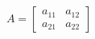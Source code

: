 \documentclass[preview]{standalone}
\begin{document}
\begin{align*}
A = \begin{bmatrix} a_{11} & a_{12} \\ a_{21} & a_{22} \end{bmatrix}
\end{align*}
\end{document}
